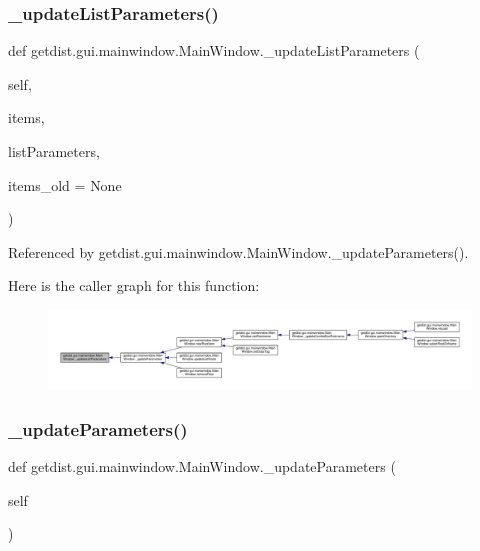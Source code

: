 \subsubsection{\texorpdfstring{\+\_\+update\+List\+Parameters()}{\_updateListParameters()}}
{\footnotesize\ttfamily def getdist.\+gui.\+mainwindow.\+Main\+Window.\+\_\+update\+List\+Parameters (\begin{DoxyParamCaption}\item[{}]{self,  }\item[{}]{items,  }\item[{}]{list\+Parameters,  }\item[{}]{items\+\_\+old = {\ttfamily None} }\end{DoxyParamCaption})\hspace{0.3cm}{\ttfamily [private]}}



Referenced by getdist.\+gui.\+mainwindow.\+Main\+Window.\+\_\+update\+Parameters().

Here is the caller graph for this function\+:
\nopagebreak
\begin{figure}[H]
\begin{center}
\leavevmode
\includegraphics[width=350pt]{classgetdist_1_1gui_1_1mainwindow_1_1MainWindow_a4136dbf5a3f107c064a7b5a58c4dcdb7_icgraph}
\end{center}
\end{figure}
\mbox{\label{classgetdist_1_1gui_1_1mainwindow_1_1MainWindow_a77a47206bb3e2ecb4dbac87af2f85f6e}} 
\subsubsection{\texorpdfstring{\+\_\+update\+Parameters()}{\_updateParameters()}}
{\footnotesize\ttfamily def getdist.\+gui.\+mainwindow.\+Main\+Window.\+\_\+update\+Parameters (\begin{DoxyParamCaption}\item[{}]{self }\end{DoxyParamCaption})\hspace{0.3cm}{\ttfamily [private]}}




